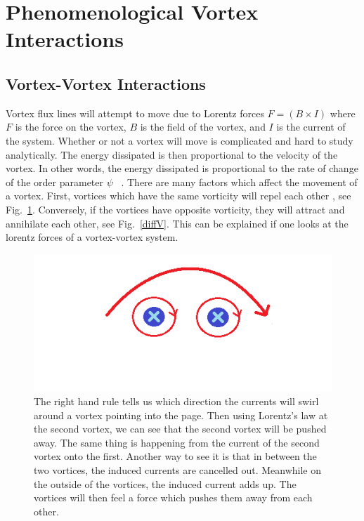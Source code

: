 \section{Phenomenological Vortex Interactions}

\subsection{Vortex-Vortex Interactions}
	 Vortex flux lines will attempt to move due to Lorentz forces $F = (B \times I)$ where $F$ is the force on the vortex, $B$ is the field of the vortex, and $I$ is the current of the system. Whether or not a vortex will move is complicated and hard to study analytically. The energy dissipated is then proportional to the velocity of the vortex. In other words, the energy dissipated is proportional to the rate of change of the order parameter $\psi$ ~\cite{Kopnin00}. There are many factors which affect the movement of a vortex. First, vortices which have the same vorticity will repel each other , see Fig.~\ref{sameV}. Conversely, if the vortices have opposite vorticity, they will attract and annihilate each other, see Fig.~\ref{diffV}. This can be explained if one looks at the lorentz forces of a vortex-vortex system.

\begin{figure}[htbp]
\begin{center}
\includegraphics[scale=.50]{sameDirection.png}
\caption{The right hand rule tells us which direction the currents will swirl around a vortex pointing into the page. Then using Lorentz's law  at the second vortex, we can see that the second vortex will be pushed away. The same thing is happening from the current of the second vortex onto the first. Another way to see it is that in between the two vortices, the induced currents are cancelled out. Meanwhile on the outside of the vortices, the induced current adds up. The vortices will then feel a force which pushes them away from each other.}
\label{sameV}
\end{center}
\end{figure}

